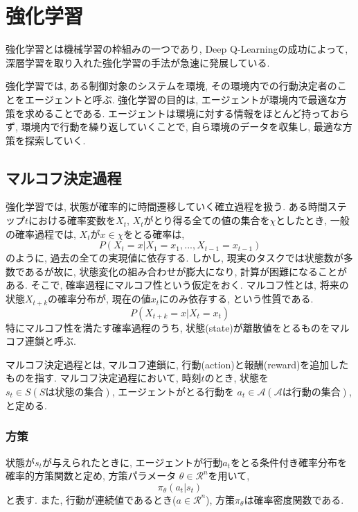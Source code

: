 \documentclass[../main]{subfiles}
\begin{document}
\newpage
\chapter{強化学習}
\label{chap:RL}
強化学習とは機械学習の枠組みの一つであり, 
Deep Q-Learning\cite{ref:dqn}の成功によって, 
深層学習を取り入れた強化学習の手法が急速に発展している.

強化学習では, ある制御対象のシステムを環境, 
その環境内での行動決定者のことをエージェントと呼ぶ.
強化学習の目的は, 
エージェントが環境内で最適な方策を求めることである.
エージェントは環境に対する情報をほとんど持っておらず, 
環境内で行動を繰り返していくことで, 
自ら環境のデータを収集し, 最適な方策を探索していく.

\section{マルコフ決定過程}
強化学習では, 状態が確率的に時間遷移していく確立過程を扱う.
ある時間ステップ$t$における確率変数を$X_t$, 
$X_t$がとり得る全ての値の集合を$\chi$としたとき, 
一般の確率過程では, $X_t$が$x\in\chi$をとる確率は, 
\begin{equation}
P(X_t=x|X_1=x_1, ... ,X_{t-1}=x_{t-1})
\end{equation}
のように, 過去の全ての実現値に依存する.
しかし, 現実のタスクでは状態数が多数であるが故に, 
状態変化の組み合わせが膨大になり, 計算が困難になることがある.
そこで, 確率過程にマルコフ性という仮定をおく.
マルコフ性とは, 将来の状態$X_{t+k}$の確率分布が, 
現在の値$x_t$にのみ依存する, という性質である.
\begin{equation}
P(X_{t+k}=x|X_t=x_t)
\end{equation}
特にマルコフ性を満たす確率過程のうち, 
状態(state)が離散値をとるものをマルコフ連鎖と呼ぶ.

マルコフ決定過程とは, マルコフ連鎖に, 
行動(action)と報酬(reward)を追加したものを指す.
マルコフ決定過程において, 
時刻$t$のとき, 状態を$s_t \in S(Sは状態の集合)$, 
エージェントがとる行動を
$a_t \in \mathcal{A}(\mathcal{A}は行動の集合)$, 
と定める. 

\subsection{方策}
状態が$s_t$が与えられたときに, 
エージェントが行動$a_t$をとる条件付き確率分布を
確率的方策関数と定め, 方策パラメータ
$\theta \in \mathcal{R}^n$を用いて, 
\begin{equation}
\pi_\theta(a_t|s_t)
\end{equation}
と表す. また, 行動が連続値であるとき($a \in \mathcal{R}^n$),
方策$\pi_\theta$は確率密度関数である.
\end{document}

